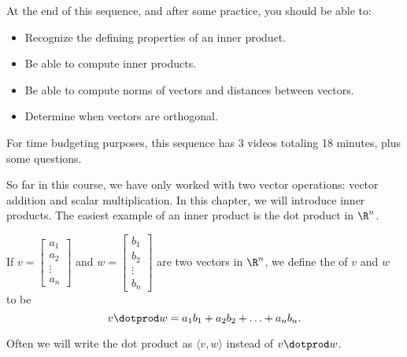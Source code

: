 







At the end of this sequence, and after some practice, you should be able to:

\begin{itemize}
\item Recognize the defining properties of an inner product.  
\item Be able to compute inner products.  
\item Be able to compute norms of vectors and distances between vectors.  
\item Determine when vectors are orthogonal.  
\end{itemize}


For time budgeting purposes, this sequence has 3 videos totaling 18 minutes, 
plus some questions.  




\endedxtext

\endedxvertical






So far in this course, we have only worked with two vector operations: vector addition and scalar 
multiplication.  In this chapter, we will introduce inner products.  The easiest example of an inner
product is the dot product in $\R^n$.  

{} If $v = \left[ \begin{array}{c} a_1 \\ a_2 \\ \vdots \\ a_n \end{array} \right]$
and $w = \left[ \begin{array}{c} b_1 \\ b_2 \\ \vdots \\ b_n \end{array} \right]$ are two vectors in
$\R^n$, we define the {} of $v$ and $w$ to be 
\[ v\dotprod w = a_1b_1 + a_2b_2 + \ldots + a_nb_n. \]

Often we will write the dot product as $\langle v, w\rangle$ instead of $v\dotprod w$.  

\endedxtext



